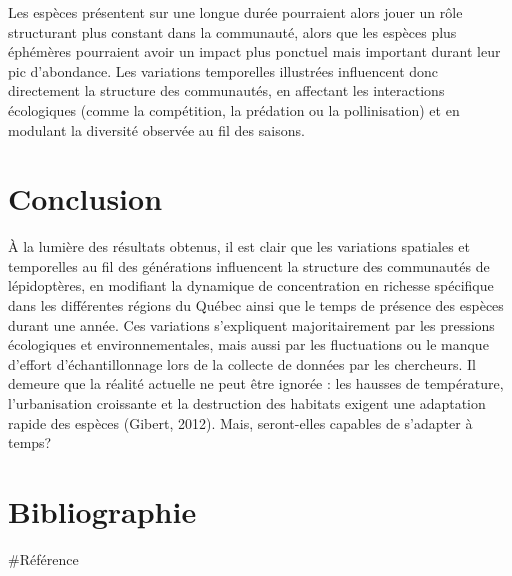 \documentclass[9pt,twocolumn,twoside,]{pnas-new}
\begin{document}
Les espèces présentent sur une longue durée pourraient alors jouer un
rôle structurant plus constant dans la communauté, alors que les espèces
plus éphémères pourraient avoir un impact plus ponctuel mais important
durant leur pic d'abondance. Les variations temporelles illustrées
influencent donc directement la structure des communautés, en affectant
les interactions écologiques (comme la compétition, la prédation ou la
pollinisation) et en modulant la diversité observée au fil des saisons.

\section*{Conclusion}\label{conclusion}

À la lumière des résultats obtenus, il est clair que les variations
spatiales et temporelles au fil des générations influencent la structure
des communautés de lépidoptères, en modifiant la dynamique de
concentration en richesse spécifique dans les différentes régions du
Québec ainsi que le temps de présence des espèces durant une année. Ces
variations s'expliquent majoritairement par les pressions écologiques et
environnementales, mais aussi par les fluctuations ou le manque d'effort
d'échantillonnage lors de la collecte de données par les chercheurs. Il
demeure que la réalité actuelle ne peut être ignorée : les hausses de
température, l'urbanisation croissante et la destruction des habitats
exigent une adaptation rapide des espèces (Gibert, 2012). Mais,
seront-elles capables de s'adapter à temps?

\section*{Bibliographie}\label{bibliographie}

\#Référence
\end{document}
